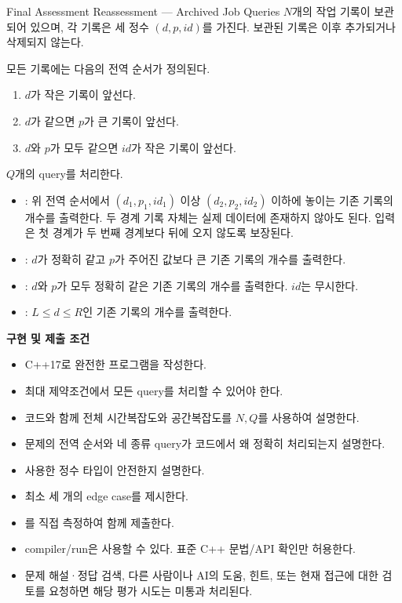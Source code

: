 \begin{problembox}{Final Assessment Reassessment --- Archived Job Queries}
$N$개의 작업 기록이 보관되어 있으며, 각 기록은 세 정수 $(d,p,id)$를 가진다. 보관된 기록은 이후 추가되거나 삭제되지 않는다.

모든 기록에는 다음의 전역 순서가 정의된다.
\begin{enumerate}
\item $d$가 작은 기록이 앞선다.
\item $d$가 같으면 $p$가 큰 기록이 앞선다.
\item $d$와 $p$가 모두 같으면 $id$가 작은 기록이 앞선다.
\end{enumerate}

$Q$개의 query를 처리한다.
\begin{itemize}
\item {}: 위 전역 순서에서 $(d_1,p_1,id_1)$ 이상 $(d_2,p_2,id_2)$ 이하에 놓이는 기존 기록의 개수를 출력한다. 두 경계 기록 자체는 실제 데이터에 존재하지 않아도 된다. 입력은 첫 경계가 두 번째 경계보다 뒤에 오지 않도록 보장된다.
\item {}: $d$가 정확히 같고 $p$가 주어진 값보다 큰 기존 기록의 개수를 출력한다.
\item {}: $d$와 $p$가 모두 정확히 같은 기존 기록의 개수를 출력한다. $id$는 무시한다.
\item {}: $L\le d\le R$인 기존 기록의 개수를 출력한다.
\end{itemize}

\textbf{구현 및 제출 조건}
\begin{itemize}
\item C++17로 완전한 프로그램을 작성한다.
\item 최대 제약조건에서 모든 query를 처리할 수 있어야 한다.
\item 코드와 함께 전체 시간복잡도와 공간복잡도를 $N,Q$를 사용하여 설명한다.
\item 문제의 전역 순서와 네 종류 query가 코드에서 왜 정확히 처리되는지 설명한다.
\item 사용한 정수 타입이 안전한지 설명한다.
\item 최소 세 개의 edge case를 제시한다.
\item {}를 직접 측정하여 함께 제출한다.
\item compiler/run은 사용할 수 있다. 표준 C++ 문법/API 확인만 허용한다.
\item 문제 해설·정답 검색, 다른 사람이나 AI의 도움, 힌트, 또는 현재 접근에 대한 검토를 요청하면 해당 평가 시도는 미통과 처리된다.
\end{itemize}


\end{problembox}
